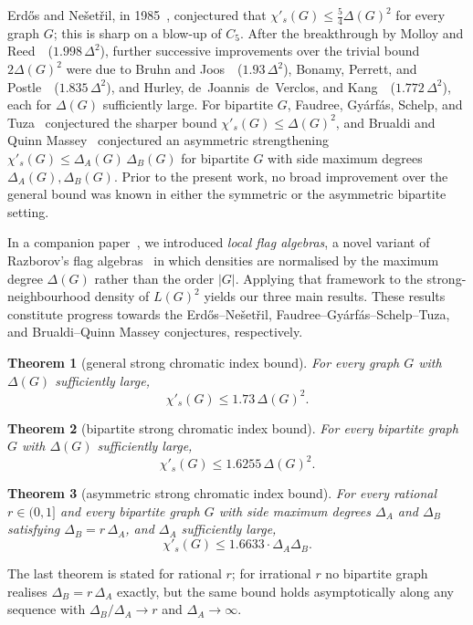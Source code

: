 \documentclass[11pt,a4paper]{article}
\newtheorem{theorem}{Theorem}[section]
\theoremstyle{definition}
\theoremstyle{remark}
\begin{document}
Erd\H{o}s and Ne\v{s}et\v{r}il, in
1985~\cite{faudreeInducedMatchingsBipartite1989}, conjectured that
$\chi'_s(G) \leq \tfrac{5}{4}\Delta(G)^2$ for every graph $G$; this is sharp
on a blow-up of $C_5$. After the breakthrough by Molloy and
Reed~\cite{molloyBoundStrongChromatic1997}~($1.998\,\Delta^2$), further successive improvements over the trivial bound
$2\Delta(G)^2$ were due to
Bruhn and Joos~\cite{bruhnStrongerBoundStrong2018}~($1.93\,\Delta^2$),
Bonamy, Perrett, and
Postle~\cite{bonamyColouringGraphsSparse2018}~($1.835\,\Delta^2$),
and Hurley, de~Joannis~de~Verclos, and
Kang~\cite{hurleyImprovedProcedureColouring2022}~($1.772\,\Delta^2$),
each for $\Delta(G)$ sufficiently
large. For bipartite $G$, Faudree,
Gy\'arf\'as, Schelp, and
Tuza~\cite{faudreeInducedMatchingsBipartite1989} conjectured the
sharper bound $\chi'_s(G) \leq \Delta(G)^2$, and Brualdi and
Quinn Massey~\cite{brualdiIncidenceStrongEdge1993} conjectured an
asymmetric strengthening $\chi'_s(G) \leq \Delta_A(G)\,\Delta_B(G)$
for bipartite $G$ with side maximum degrees $\Delta_A(G), \Delta_B(G)$. Prior to
the present work, no broad improvement over the general bound was known
in either the symmetric or the asymmetric bipartite setting.

In a companion
paper~\cite{daveyPentagonLocalFlags2026}, we introduced \emph{local flag
algebras}, a novel variant of Razborov's flag
algebras~\cite{razborovFlagAlgebras2007} in which densities are
normalised by the maximum degree $\Delta(G)$ rather than the order
$|G|$. Applying that framework to the
strong-neighbourhood density of $L(G)^2$ yields our three main results.
These results constitute progress towards the Erd\H{o}s--Ne\v{s}et\v{r}il, Faudree--Gy\'arf\'as--Schelp--Tuza,
and Brualdi--Quinn Massey conjectures, respectively.


\begin{theorem}[general strong chromatic index bound]
\label{thm:sec-general}
For every graph $G$ with $\Delta(G)$ sufficiently large,
\[
\chi'_s(G) \leq 1.73\,\Delta(G)^2.
\]
\end{theorem}

\begin{theorem}[bipartite strong chromatic index bound]
\label{thm:sec-bipartite}
For every bipartite graph $G$ with $\Delta(G)$ sufficiently large,
\[
\chi'_s(G) \leq 1.6255\,\Delta(G)^2.
\]
\end{theorem}

\begin{theorem}[asymmetric strong chromatic index bound]
\label{thm:asym-sec}
For every rational $r \in (0, 1]$ and every bipartite graph $G$
with side maximum degrees $\Delta_A$ and $\Delta_B$ satisfying
$\Delta_B = r\,\Delta_A$, and $\Delta_A$ sufficiently large,
\[
\chi'_s(G) \leq 1.6633 \cdot \Delta_A \Delta_B.
\]
\end{theorem}
\noindent
The last theorem is stated for rational $r$; for irrational $r$ no
bipartite graph realises $\Delta_B = r\,\Delta_A$ exactly, but the
same bound holds asymptotically along any sequence with
$\Delta_B/\Delta_A \to r$ and $\Delta_A \to \infty$.
\end{document}
